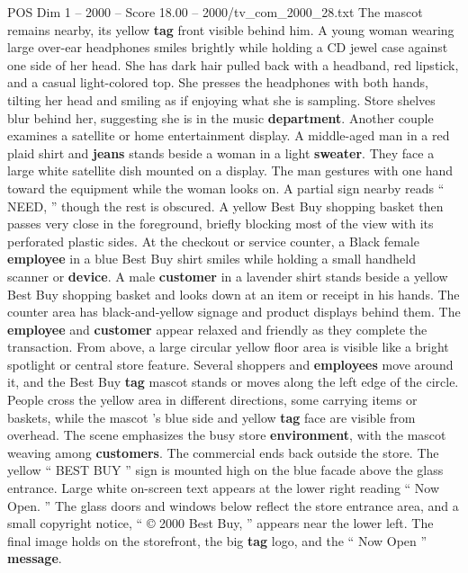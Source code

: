 \begin{textsample}{POS Dim 1 – 2000 – Score 18.00 – 2000/tv\_com\_2000\_28.txt}
The mascot remains nearby, its yellow \textbf{tag} front visible behind him.
A young woman wearing large over-ear headphones smiles brightly while holding a CD jewel case against one side of her head.
She has dark hair pulled back with a headband, red lipstick, and a casual light-colored top.
She presses the headphones with both hands, tilting her head and smiling as if enjoying what she is sampling.
Store shelves blur behind her, suggesting she is in the music \textbf{department}.
Another couple examines a satellite or home entertainment display.
A middle-aged man in a red plaid shirt and \textbf{jeans} stands beside a woman in a light \textbf{sweater}.
They face a large white satellite dish mounted on a display.
The man gestures with one hand toward the equipment while the woman looks on.
A partial sign nearby reads “ NEED, ” though the rest is obscured.
A yellow Best Buy shopping basket then passes very close in the foreground, briefly blocking most of the view with its perforated plastic sides.
At the checkout or service counter, a Black female \textbf{employee} in a blue Best Buy shirt smiles while holding a small handheld scanner or \textbf{device}.
A male \textbf{customer} in a lavender shirt stands beside a yellow Best Buy shopping basket and looks down at an item or receipt in his hands.
The counter area has black-and-yellow signage and product displays behind them.
The \textbf{employee} and \textbf{customer} appear relaxed and friendly as they complete the transaction.
From above, a large circular yellow floor area is visible like a bright spotlight or central store feature.
Several shoppers and \textbf{employees} move around it, and the Best Buy \textbf{tag} mascot stands or moves along the left edge of the circle.
People cross the yellow area in different directions, some carrying items or baskets, while the mascot ’s blue side and yellow \textbf{tag} face are visible from overhead.
The scene emphasizes the busy store \textbf{environment}, with the mascot weaving among \textbf{customers}.
The commercial ends back outside the store.
The yellow “ BEST BUY ” sign is mounted high on the blue facade above the glass entrance.
Large white on-screen text appears at the lower right reading “ Now Open. ” The glass doors and windows below reflect the store entrance area, and a small copyright notice, “ {\EmojiFont ©} 2000 Best Buy, ” appears near the lower left.
The final image holds on the storefront, the big \textbf{tag} logo, and the “ Now Open ” \textbf{message}.

\end{textsample}
